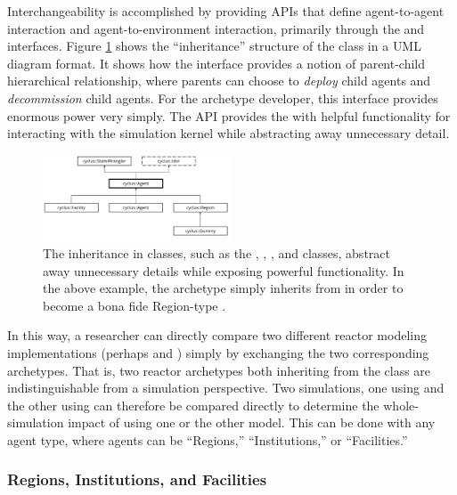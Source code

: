 Interchangeability is accomplished by providing \glspl{API} that define agent-to-agent
interaction and agent-to-environment interaction, primarily through the
 and  interfaces. Figure \ref{fig:agent_uml} shows
the ``inheritance'' structure of the  class in a \gls{UML} diagram
format. It shows how the  interface
provides a notion of parent-child hierarchical relationship, where parents can
choose to \textit{deploy} child agents and \textit{decommission} child
agents. For the archetype developer, this interface provides enormous power
very simply. The \gls{API} provides the  with helpful functionality for
interacting with the \Cyclus simulation kernel while abstracting away unnecessary
detail.

\begin{figure}[htbp!]
\begin{center}
\includegraphics[width=0.5\textwidth]{./images/agent_uml}
\end{center}
\caption{The inheritance in \Cyclus classes, such as the ,
, , and  classes, abstract away
unnecessary details while exposing powerful functionality. In the above
example, the  archetype simply inherits from  in
order to become a bona fide Region-type .}
\label{fig:agent_uml}
\end{figure}

In this way, a researcher can directly compare two different reactor modeling
implementations (perhaps  and )
simply by exchanging the two corresponding archetypes. That is, two reactor
archetypes both inheriting from the  class are indistinguishable
from a simulation perspective. Two simulations, one using
 and the other using  can therefore
be compared directly to determine the whole-simulation impact of using one or the other model.
This can be done with any agent type, where agents can be ``Regions,''
``Institutions,'' or ``Facilities.''

\subsubsection{Regions, Institutions, and Facilities}

